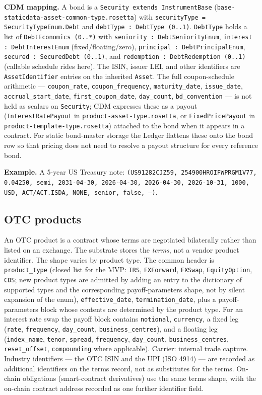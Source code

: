 \documentclass[11pt,a4paper]{article}
\begin{document}
\textbf{CDM mapping.} A bond is a \texttt{Security extends InstrumentBase} (\texttt{base-staticdata-asset-common-type.rosetta}) with \texttt{securityType = SecurityTypeEnum.Debt} and \texttt{debtType : DebtType (0..1)}. \texttt{DebtType} holds a list of \texttt{DebtEconomics (0..*)} with \texttt{seniority : DebtSeniorityEnum}, \texttt{interest : DebtInterestEnum} (fixed/floating/zero), \texttt{principal : DebtPrincipalEnum}, \texttt{secured : SecuredDebt (0..1)}, and \texttt{redemption : DebtRedemption (0..1)} (callable schedule rides here). The ISIN, issuer LEI, and other identifiers are \texttt{AssetIdentifier} entries on the inherited \texttt{Asset}. The full coupon-schedule arithmetic --- \texttt{coupon\_rate}, \texttt{coupon\_frequency}, \texttt{maturity\_date}, \texttt{issue\_date}, \texttt{accrual\_start\_date}, \texttt{first\_coupon\_date}, \texttt{day\_count}, \texttt{bd\_convention} --- is not held as scalars on \texttt{Security}; CDM expresses these as a payout (\texttt{InterestRatePayout} in \texttt{product-asset-type.rosetta}, or \texttt{FixedPricePayout} in \texttt{product-template-type.rosetta}) attached to the bond when it appears in a contract. For static bond-master storage the Ledger flattens these onto the bond row so that pricing does not need to resolve a payout structure for every reference bond.

\textbf{Example.} A 5-year US Treasury note: \texttt{(US91282CJZ59, 254900HROIFWPRGM1V77, 0.04250, semi, 2031-04-30, 2026-04-30, 2026-04-30, 2026-10-31, 1000, USD, ACT/ACT.ISDA, NONE, senior, false, ---)}.

\subsection{OTC products}

An OTC product is a contract whose terms are negotiated bilaterally rather than listed on an exchange. The substrate stores the \emph{terms}, not a vendor product identifier. The shape varies by product type. The common header is \texttt{product\_type} (closed list for the MVP: \texttt{IRS}, \texttt{FXForward}, \texttt{FXSwap}, \texttt{EquityOption}, \texttt{CDS}; new product types are admitted by adding an entry to the dictionary of supported types and the corresponding payoff-parameters shape, not by silent expansion of the enum), \texttt{effective\_date}, \texttt{termination\_date}, plus a payoff-parameters block whose contents are determined by the product type. For an interest rate swap the payoff block contains \texttt{notional}, \texttt{currency}, a fixed leg (\texttt{rate}, \texttt{frequency}, \texttt{day\_count}, \texttt{business\_centres}), and a floating leg (\texttt{index\_name}, \texttt{tenor}, \texttt{spread}, \texttt{frequency}, \texttt{day\_count}, \texttt{business\_centres}, \texttt{reset\_offset}, \texttt{compounding} where applicable). Carrier: internal trade capture. Industry identifiers --- the OTC ISIN and the UPI (ISO 4914) --- are recorded as additional identifiers on the terms record, not as substitutes for the terms. On-chain obligations (smart-contract derivatives) use the same terms shape, with the on-chain contract address recorded as one further identifier field.
\end{document}
